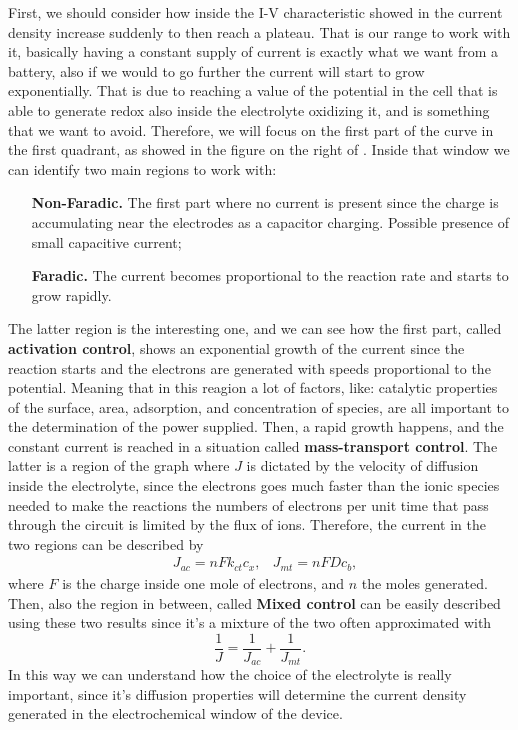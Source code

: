 First, we should consider how inside the I-V characteristic showed in  the current density increase suddenly to then reach a plateau. That is our range to work with it, basically having a constant supply of current is exactly what we want from a battery, also if we would to go further the current will start to grow exponentially. That is due to reaching a value of the potential in the cell that is able to generate redox also inside the electrolyte oxidizing it, and is something that we want to avoid. Therefore, we will focus on the first part of the curve in the first quadrant, as showed in the figure on the right of . Inside that window we can identify two main regions to work with:
\begin{itemize}[align=left, leftmargin=*]
    \item[\textbf{Non-Faradic.}] The first part where no current is present since the charge is accumulating near the electrodes as a capacitor charging. Possible presence of small capacitive current;
    \item[\textbf{Faradic.}] The current becomes proportional to the reaction rate and starts to grow rapidly. 
\end{itemize}
The latter region is the interesting one, and we can see how the first part, called \textbf{activation control}, shows an exponential growth of the current since the reaction starts and the electrons are generated with speeds proportional to the potential. Meaning that in this reagion a lot of factors, like: catalytic properties of the surface, area, adsorption, and concentration of species, are all important to the determination of the power supplied. Then, a rapid growth happens, and the constant current is reached in a situation called \textbf{mass-transport control}. The latter is a region of the graph where $J$ is dictated by the velocity of diffusion inside the electrolyte, since the electrons goes much faster than the ionic species needed to make the reactions the numbers of electrons per unit time that pass through the circuit is limited by the flux of ions. Therefore, the current in the two regions can be described by
\begin{align}
    &J_{ac} = nFk_{ct}c_x, &J_{mt} = nFDc_b,
\end{align}
where $F$ is the charge inside one mole of electrons, and $n$ the moles generated. Then, also the region in between, called \textbf{Mixed control} can be easily described using these two results since it's a mixture of the two often approximated with
\begin{equation}
    \frac{1}{J} = \frac{1}{J_{ac}} + \frac{1}{J_{mt}}.
\end{equation}
In this way we can understand how the choice of the electrolyte is really important, since it's diffusion properties will determine the current density generated in the electrochemical window of the device.

